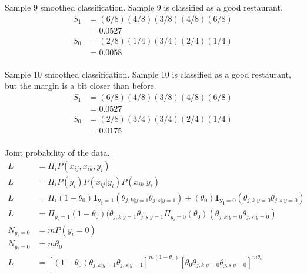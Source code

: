 \documentclass[newpage]{homework}
\begin{document}
Sample 9 smoothed classification. Sample 9 is classified as a good restaurant.
\begin{align*}
    S_1 &=  (6/8)(4/8)(3/8)(4/8)(6/8)\\
        &=  0.0527  \\
    S_0 &=  (2/8)(1/4)(3/4)(2/4)(1/4)\\
        &=  0.0058  \\
\end{align*}

Sample 10 smoothed classification. Sample 10 is classified as a good restaurant, but the margin is a bit closer than before.
\begin{align*}
    S_1 &=  (6/8)(4/8)  (3/8)  (4/8)  (6/8)	\\
        &=  0.0527 \\
    S_0 &=  (2/8)(3/4)  (3/4)  (2/4)  (1/4)	\\
        &=  0.0175 \\
\end{align*}


\question
Joint probability of the data.
\begin{align*}
    L	&=	\Pi_i P(x_{ij}, x_{ik}, y_i) 	\\
    L	&=	\Pi_i P(y_i) P(x_{ij}|y_i) P(x_{ik}|y_i) 	\\
    L	&=	\Pi_i (1-\theta_0) \mathbf{1_{y_i=1}} \left(\theta_{j,k|y=1} \theta_{j,s|y=1} \right) + (\theta_0) \mathbf{1_{y_i=0}} \left( \theta_{j,k|y=0} \theta_{j,s|y=0} \right)	\\
    L   &=  \Pi_{y_i = 1} (1-\theta_0 )(\theta_{j,k|y=1} \theta_{j,s|y=1} \Pi_{y_i = 0} (\theta_0) (\theta_{j,k|y=0} \theta_{j,s|y=0})   \\
    N_{y_i = 0} &=  mP(y_i=0)   \\
    N_{y_i = 0} &=  m\theta_0   \\
    L   &=  \boxed{\left[(1-\theta_0) \theta_{j,k|y=1} \theta_{j,s|y=1}\right]^{m(1-\theta_0)} \left[\theta_0 \theta_{j,k|y=0} \theta_{j,s|y=0}\right]^{m\theta_0}}    \\
\end{align*}
\end{document}
